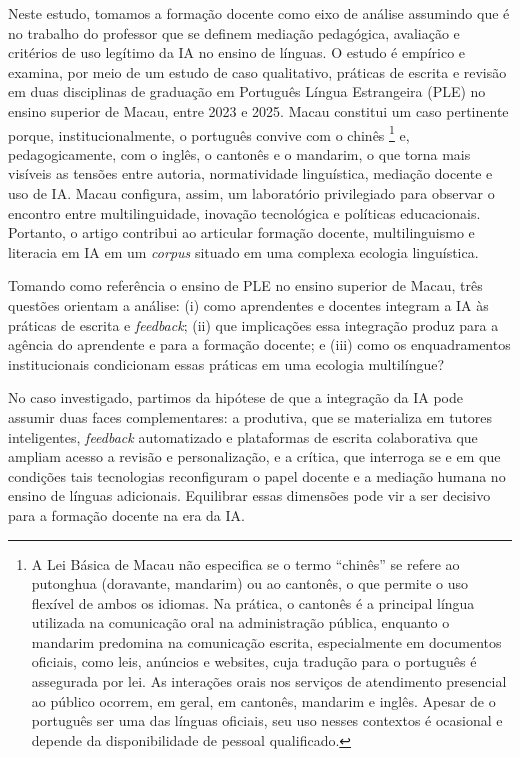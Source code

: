 \documentclass[portuguese]{textolivre}
\begin{document}
Neste estudo, tomamos a formação docente como eixo de análise assumindo que é no trabalho do professor que se definem mediação pedagógica, avaliação e critérios de uso legítimo da IA no ensino de línguas. O estudo é empírico e examina, por meio de um estudo de caso qualitativo, práticas de escrita e revisão em duas disciplinas de graduação em Português Língua Estrangeira (PLE) no ensino superior de Macau, entre 2023 e 2025. Macau constitui um caso pertinente porque, institucionalmente, o português convive com o chinês \footnote{A Lei Básica de Macau não especifica se o termo “chinês” se refere ao putonghua (doravante, mandarim) ou ao cantonês, o que permite o uso flexível de ambos os idiomas. Na prática, o cantonês é a principal língua utilizada na comunicação oral na administração pública, enquanto o mandarim predomina na comunicação escrita, especialmente em documentos oficiais, como leis, anúncios e websites, cuja tradução para o português é assegurada por lei. As interações orais nos serviços de atendimento presencial ao público ocorrem, em geral, em cantonês, mandarim e inglês. Apesar de o português ser uma das línguas oficiais, seu uso nesses contextos é ocasional e depende da disponibilidade de pessoal qualificado.} e, pedagogicamente, com o inglês, o cantonês e o mandarim, o que torna mais visíveis as tensões entre autoria, normatividade linguística, mediação docente e uso de IA. Macau configura, assim, um laboratório privilegiado para observar o encontro entre multilinguidade, inovação tecnológica e políticas educacionais. Portanto, o artigo contribui ao articular formação docente, multilinguismo e literacia em IA em um \textit{corpus} situado em uma complexa ecologia linguística. 

Tomando como referência o ensino de PLE no ensino superior de Macau, três questões orientam a análise: (i) como aprendentes e docentes integram a IA às práticas de escrita e \textit{feedback}; (ii) que implicações essa integração produz para a agência do aprendente e para a formação docente; e (iii) como os enquadramentos institucionais condicionam essas práticas em uma ecologia multilíngue?

No caso investigado, partimos da hipótese de que a integração da IA pode assumir duas faces complementares: a produtiva, que se materializa em tutores inteligentes, \textit{feedback} automatizado e plataformas de escrita colaborativa que ampliam acesso a revisão e personalização, e a crítica, que interroga se e em que condições tais tecnologias reconfiguram o papel docente e a mediação humana no ensino de línguas adicionais. Equilibrar essas dimensões pode vir a ser decisivo para a formação docente na era da IA.
\end{document}
